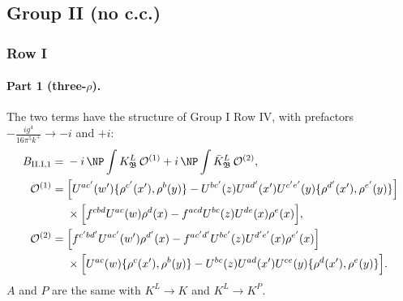 \subsection{Group II (no c.c.)}
\subsubsection{Row I}
\paragraph{Part 1 (three-$\rho$).} The two terms have the structure of Group I Row IV, with prefactors $-\frac{ig^4}{16\pi^5k^+}\to-i$ and $+i$:
\begin{align}
B_{\rm II.I,1}={}&-i\,\NP\int K^L_{\mathfrak B}\,\mathcal O^{(1)}+i\,\NP\int\bar K^L_{\mathfrak B}\,\mathcal O^{(2)},\notag\\
\mathcal O^{(1)}={}&\Big[U^{ac'}(w')\{\rho^{c'}(x'),\rho^b(y)\}-U^{bc'}(z)U^{ad'}(x')U^{c'e'}(y)\{\rho^{d'}(x'),\rho^{e'}(y)\}\Big]\notag\\
&\times\Big[f^{cbd}U^{ac}(w)\rho^d(x)-f^{acd}U^{bc}(z)U^{de}(x)\rho^e(x)\Big],\notag\\
\mathcal O^{(2)}={}&\Big[f^{c'bd'}U^{ac'}(w')\rho^{d'}(x)-f^{ac'd'}U^{bc'}(z)U^{d'e'}(x)\rho^{e'}(x)\Big]\notag\\
&\times\Big[U^{ac}(w)\{\rho^c(x'),\rho^b(y)\}-U^{bc}(z)U^{ad}(x')U^{ce}(y)\{\rho^d(x'),\rho^e(y)\}\Big].
\end{align}
$A$ and $P$ are the same with $K^L\to K$ and $K^L\to K^P$.

